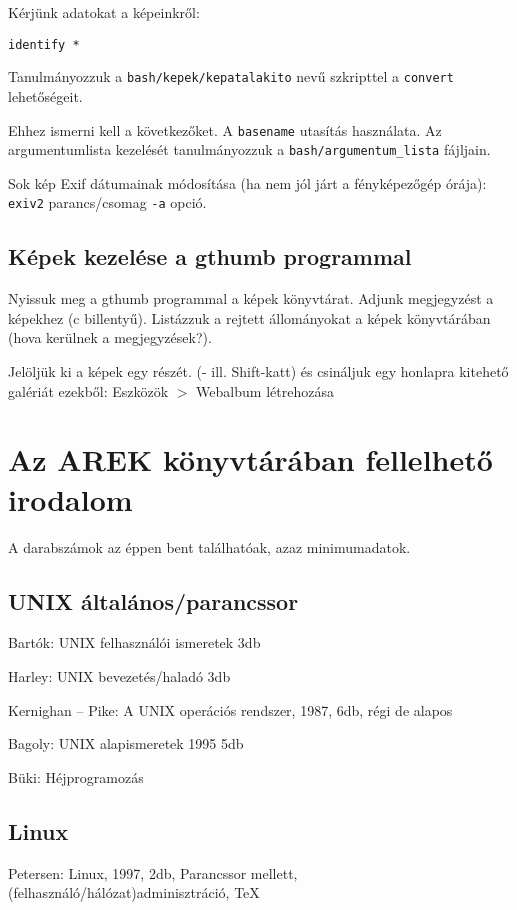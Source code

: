 \documentclass[a4paper]{article}
\newcommand{\code}{\texttt}
\newcommand{\dir}{\code}
\newcommand{\Ctrl}{\framebox{\texttt{Ctrl}}}
\begin{document}
Kérjünk adatokat a képeinkről:
\begin{Verbatim}
identify *
\end{Verbatim}

Tanulmányozzuk a \code{bash/kepek/kepatalakito} nevű szkripttel a
\code{convert} lehetőségeit.

Ehhez ismerni kell a következőket.
A \code{basename} utasítás használata.
Az argumentumlista kezelését tanulmányozzuk a \dir{bash/argumentum\_lista} fájljain.

Sok kép Exif dátumainak módosítása (ha nem jól járt a fényképezőgép
órája): \code{exiv2} parancs/csomag \code{-a} opció.

\subsection{Képek kezelése a gthumb programmal}
Nyissuk meg a gthumb programmal a képek könyvtárat. Adjunk megjegyzést a
képekhez (c billentyű). Listázzuk a rejtett állományokat a képek
könyvtárában (hova kerülnek a megjegyzések?).

Jelöljük ki a képek egy részét. (\Ctrl- ill. Shift-katt) és csináljuk egy
honlapra kitehető galériát ezekből: Eszközök $>$ Webalbum létrehozása

\newpage
\appendix

\section{Az AREK könyvtárában fellelhető irodalom}
A darabszámok az éppen bent találhatóak, azaz minimumadatok.
\subsection{UNIX általános/parancssor}

Bartók: UNIX felhasználói ismeretek 3db

Harley: UNIX bevezetés/haladó 3db

Kernighan -- Pike: A UNIX operációs rendszer, 1987, 6db, régi de alapos

Bagoly: UNIX alapismeretek 1995 5db

Büki: Héjprogramozás

\subsection{Linux}

Petersen: Linux, 1997, 2db, Parancssor mellett, (felhasználó/hálózat)adminisztráció, TeX
\end{document}
